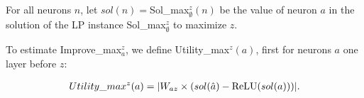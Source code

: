\iffalse
\begin{align*}
	|(I_X - \sum_{b\in X} I_b)/I_X| < 1\%. \ (\text{in experiments})
\end{align*} Even $X$ contains neurons from 3 layers before the target layer, in experiments, $I_X$ is still close to $\sum_{b\in X} I_b$.

Therefore, based on this observation, the question to choose $X$ is converted to compute $I_b$ for neurons $b$ in layers before the target layer. Our formula is to estimate the improvement of different individual neurons in different layers. For different layers, the formula will be different.  However, neither the observation in this subsection nor the formula in the next subsection has solid theoretical proof to show that they are very accurate. They are all based on experiments. 


In our algorithm, we will open neurons at most 3 layer3 before the target layer. So the formula will consists of three parts.


\subsubsection*{Compute the improvement of a single neuron}

\subsection*{One Layer before $z$}

\fi

For all neurons $n$, let $sol(n)=$Sol\_max$_\emptyset^z(n)$ be the value of neuron $a$
in the solution of the LP instance Sol\_max$_\emptyset^z$ to maximize $z$.


To estimate Improve\_max$_a^z$, we define Utility\_max$^z(a)$, first for neurons $a$ one layer before $z$:

	\begin{align}
		Utility\_max^z(a) = |W_{az} \times (sol(\hat{a})- \mathrm{ReLU}(sol(a)))|.
	\end{align}
	

